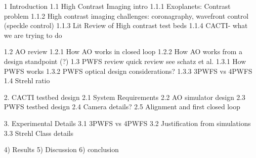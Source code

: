 1 Introduction 
1.1 High Contrast Imaging intro
    1.1.1 Exoplanets: Contrast problem
    1.1.2 High contrast imaging challenges: coronagraphy, wavefront control (speckle control)
    1.1.3 Lit Review of High contrast test beds
    1.1.4 CACTI- what we are trying to do
    
1.2 AO review
    1.2.1 How AO works in closed loop
    1.2.2 How AO works from a design standpoint (?)
1.3 PWFS review
quick review see schatz et al.
    1.3.1 How PWFS works
    1.3.2 PWFS optical design considerations?
    1.3.3 3PWFS vs 4PWFS
1.4 Strehl ratio
    
2. CACTI testbed design
    2.1 System Requirements
    2.2 AO simulator design
    2.3 PWFS testbed design
    2.4 Camera details?
    2.5 Alignment and first closed loop
    
3. Experimental Details
    3.1 3PWFS vs 4PWFS
    3.2 Justification from simulations
    3.3 Strehl Class details

4) Results
5) Discussion
6) conclusion

